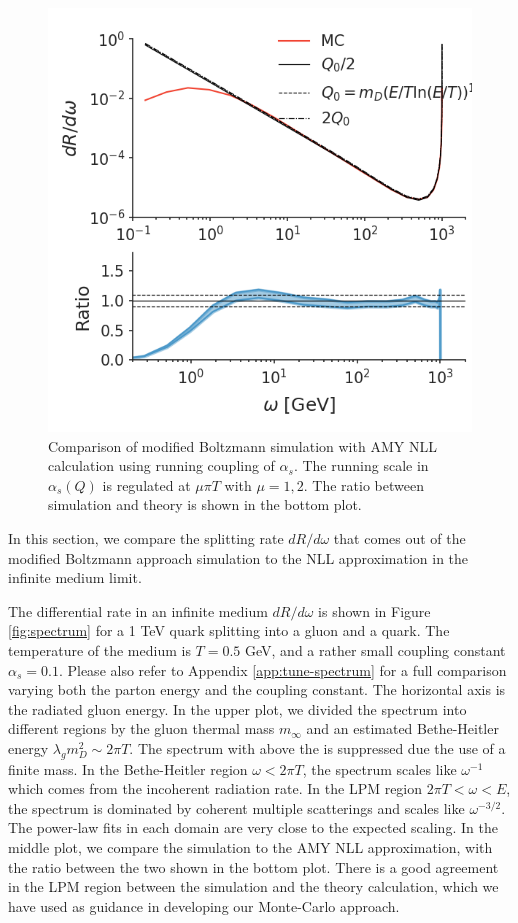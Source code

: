 \documentclass[aps, prc, reprint, amsmath, groupedaddress, nofootinbib]{revtex4-1}
\begin{document}
\begin{figure}
\includegraphics[width=\columnwidth]{running.png}
\caption{Comparison of modified Boltzmann simulation with AMY NLL calculation using running coupling of $\alpha_s$. The running scale in $\alpha_s(Q)$ is regulated at $\mu\pi T$ with $\mu=1,2$. The ratio between simulation and theory is shown in the bottom plot.}
\label{fig:running}
\end{figure}

In this section, we compare the splitting rate $dR/d\omega$ that comes out of the modified Boltzmann approach simulation to the NLL approximation in the infinite medium limit.

The differential rate in an infinite medium $dR/d\omega$ is shown in Figure \ref{fig:spectrum} for a 1 TeV quark splitting into a gluon and a quark.
The temperature of the medium is $T=0.5$ GeV, and a rather small coupling constant $\alpha_s = 0.1$.
Please also refer to Appendix \ref{app:tune-spectrum} for a full comparison varying both the parton energy and the coupling constant.
The horizontal axis is the radiated gluon energy.
In the upper plot, we divided the spectrum into different regions by the gluon thermal mass $m_\infty$ and an estimated Bethe-Heitler energy $\lambda_g m_D^2 \sim 2\pi T$.
The spectrum with above the is suppressed due the use of a finite mass.
In the Bethe-Heitler region $\omega < 2\pi T$, the spectrum scales like $\omega^{-1}$ which comes from the incoherent radiation rate.
In the LPM region $2\pi T < \omega < E$, the spectrum is dominated by coherent multiple scatterings and scales like $\omega^{-3/2}$.
The power-law fits in each domain are very close to the expected scaling.
In the middle plot, we compare the simulation to the AMY NLL approximation, with the ratio between the two shown in the bottom plot.
There is a good agreement in the LPM region between the simulation and the theory calculation, which we have used as guidance in developing our Monte-Carlo approach.
\end{document}
